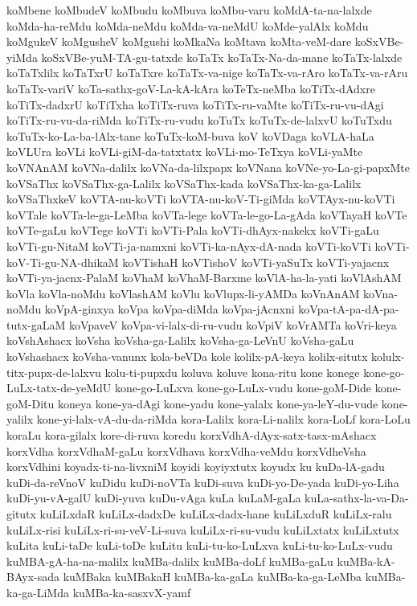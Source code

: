 {koMbene
koMbudeV
koMbudu
koMbuva
koMbu-varu
koMdA-ta-na-lalxde
koMda-ha-reMdu
koMda-neMdu
koMda-va-neMdU
koMde-yalAlx
koMdu
koMgukeV
koMgusheV
koMgushi
koMkaNa
koMtava
koMta-veM-dare
koSxVBe-yiMda
koSxVBe-yuM-TA-gu-tatxde
koTaTx
koTaTx-Na-da-mane
koTaTx-lalxde
koTaTxlilx
koTaTxrU
koTaTxre
koTaTx-va-nige
koTaTx-va-rAro
koTaTx-va-rAru
koTaTx-variV
koTa-sathx-goV-La-kA-kAra
koTeTx-neMba
koTiTx-dAdxre
koTiTx-dadxrU
koTiTxha
koTiTx-ruva
koTiTx-ru-vaMte
koTiTx-ru-vu-dAgi
koTiTx-ru-vu-da-riMda
koTiTx-ru-vudu
koTuTx
koTuTx-de-lalxvU
koTuTxdu
koTuTx-ko-La-ba-lAlx-tane
koTuTx-koM-buva
koV
koVDaga
koVLA-haLa
koVLUra
koVLi
koVLi-giM-da-tatxtatx
koVLi-mo-TeTxya
koVLi-yaMte
koVNAnAM
koVNa-dalilx
koVNa-da-lilxpapx
koVNana
koVNe-yo-La-gi-papxMte
koVSaThx
koVSaThx-ga-Lalilx
koVSaThx-kada
koVSaThx-ka-ga-Lalilx
koVSaThxkeV
koVTA-nu-koVTi
koVTA-nu-koV-Ti-giMda
koVTAyx-nu-koVTi
koVTale
koVTa-le-ga-LeMba
koVTa-lege
koVTa-le-go-La-gAda
koVTayaH
koVTe
koVTe-gaLu
koVTege
koVTi
koVTi-Pala
koVTi-dhAyx-nakekx
koVTi-gaLu
koVTi-gu-NitaM
koVTi-ja-namxni
koVTi-ka-nAyx-dA-nada
koVTi-koVTi
koVTi-koV-Ti-gu-NA-dhikaM
koVTishaH
koVTishoV
koVTi-yaSuTx
koVTi-yajacnx
koVTi-ya-jacnx-PalaM
koVhaM
koVhaM-Barxme
koVlA-ha-la-yati
koVlAshAM
koVla
koVla-noMdu
koVlashAM
koVlu
koVlupx-li-yAMDa
koVnAnAM
koVna-noMdu
koVpA-ginxya
koVpa
koVpa-diMda
koVpa-jAcnxni
koVpa-tA-pa-dA-pa-tutx-gaLaM
koVpaveV
koVpa-vi-lalx-di-ru-vudu
koVpiV
koVrAMTa
koVri-keya
koVshAshacx
koVsha
koVsha-ga-Lalilx
koVsha-ga-LeVnU
koVsha-gaLu
koVshashacx
koVsha-vanunx
kola-beVDa
kole
kolilx-pA-keya
kolilx-situtx
kolulx-titx-pupx-de-lalxvu
kolu-ti-pupxdu
koluva
koluve
kona-ritu
kone
konege
kone-go-LuLx-tatx-de-yeMdU
kone-go-LuLxva
kone-go-LuLx-vudu
kone-goM-Dide
kone-goM-Ditu
koneya
kone-ya-dAgi
kone-yadu
kone-yalalx
kone-ya-leY-du-vude
kone-yalilx
kone-yi-lalx-vA-du-da-riMda
kora-Lalilx
kora-Li-nalilx
kora-LoLf
kora-LoLu
koraLu
kora-gilalx
kore-di-ruva
koredu
korxVdhA-dAyx-satx-tasx-mAshacx
korxVdha
korxVdhaM-gaLu
korxVdhava
korxVdha-veMdu
korxVdheVsha
korxVdhini
koyadx-ti-na-livxniM
koyidi
koyiyxtutx
koyudx
ku
kuDa-lA-gadu
kuDi-da-reVnoV
kuDidu
kuDi-noVTa
kuDi-suva
kuDi-yo-De-yada
kuDi-yo-Liha
kuDi-yu-vA-galU
kuDi-yuva
kuDu-vAga
kuLa
kuLaM-gaLa
kuLa-sathx-la-va-Da-gitutx
kuLiLxdaR
kuLiLx-dadxDe
kuLiLx-dadx-hane
kuLiLxduR
kuLiLx-ralu
kuLiLx-risi
kuLiLx-ri-su-veV-Li-suva
kuLiLx-ri-su-vudu
kuLiLxtatx
kuLiLxtutx
kuLita
kuLi-taDe
kuLi-toDe
kuLitu
kuLi-tu-ko-LuLxva
kuLi-tu-ko-LuLx-vudu
kuMBA-gA-ha-na-malilx
kuMBa-dalilx
kuMBa-doLf
kuMBa-gaLu
kuMBa-kA-BAyx-sada
kuMBaka
kuMBakaH
kuMBa-ka-gaLa
kuMBa-ka-ga-LeMba
kuMBa-ka-ga-LiMda
kuMBa-ka-sasxvX-yamf
}
